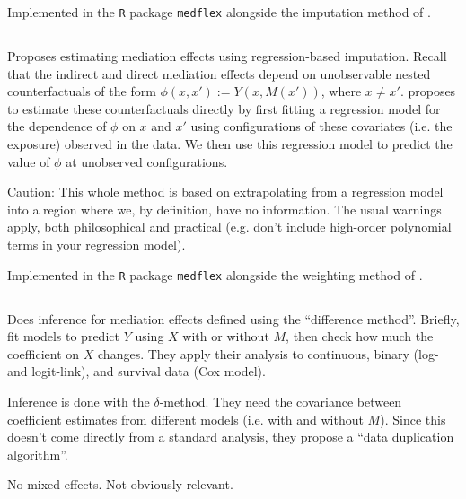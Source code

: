\documentclass{article}
\begin{document}
Implemented in the \texttt{R} package \texttt{medflex} \citep{Ste17} alongside the imputation method of \citet{Van12}.

\subsection{\citet{Van12}}

Proposes estimating mediation effects using regression-based imputation. Recall that the indirect and direct mediation effects depend on unobservable nested counterfactuals of the form $\phi(x, x') := Y(x, M(x'))$, where $x \neq x'$. \citet{Van12} proposes to estimate these counterfactuals directly by first fitting a regression model for the dependence of $\phi$ on $x$ and $x'$ using configurations of these covariates (i.e. the exposure) observed in the data. We then use this regression model to predict the value of $\phi$ at unobserved configurations.

Caution: This whole method is based on extrapolating from a regression model into a region where we, by definition, have no information. The usual warnings apply, both philosophical and practical (e.g. don't include high-order polynomial terms in your regression model).

Implemented in the \texttt{R} package \texttt{medflex} \citep{Ste17} alongside the weighting method of \citet{Lan12}.

\subsection{\citet{Nev17}}

Does inference for mediation effects defined using the ``difference method''. Briefly, fit models to predict $Y$ using $X$ with or without $M$, then check how much the coefficient on $X$ changes. They apply their analysis to continuous, binary (log- and logit-link), and survival data (Cox model).

Inference is done with the $\delta$-method. They need the covariance between coefficient estimates from different models (i.e. with and without $M$). Since this doesn't come directly from a standard analysis, they propose a ``data duplication algorithm''.

No mixed effects. Not obviously relevant.


\subsection{\citet{Che21}}
\end{document}
